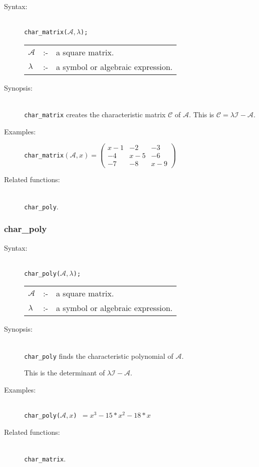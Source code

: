 \begin{description}
\item[Syntax:]\mbox{}\\
\texttt{char\_matrix($\mathcal{A},\lambda$);}\\[2mm]
\begin{tabular}{l l l}
$\mathcal{A}$ &:-& a square matrix. \\
$\lambda$  &:-& a symbol or algebraic expression.
\end{tabular}

\item[Synopsis:]\mbox{}\\
\texttt{char\_matrix} creates the characteristic matrix $\mathcal{C}$ of
$\mathcal{A}$.  This is $\mathcal{C} = \lambda \mathcal{I} - \mathcal{A}$.

\item[Examples:]
\begin{flushleft}
\texttt{char\_matrix}\((\mathcal{A},x) =
\begin{pmatrix} x-1 & -2 & -3 \\ -4 & x-5 & -6 \\ -7 & -8 & x-9 \end{pmatrix}\)
\end{flushleft}

\item[Related functions:]\mbox{}\\
\texttt{char\_poly}.
\end{description}


\subsubsection{char\_poly}
\label{linalg:char_poly}
\hypertarget{operator:CHAR_POLY}{}

\begin{description}
\item[Syntax:]\mbox{}\\
\texttt{char\_poly($\mathcal{A},\lambda$);}\\[2mm]
\begin{tabular}{l l l}
$\mathcal{A}$ &:-& a square matrix. \\
$\lambda$ &:-& a symbol or algebraic expression.
\end{tabular}

\item[Synopsis:]\mbox{}\\
\texttt{char\_poly} finds the characteristic polynomial of
                $\mathcal{A}$.

This is the determinant of $\lambda \mathcal{I} - \mathcal{A}$.

\item[Examples:]\mbox{}\\
\texttt{char\_poly($\mathcal{A},x$) $= x^3-15*x^2-18*x$}

\item[Related functions:]\mbox{}\\
 \texttt{char\_matrix}.
\end{description}


